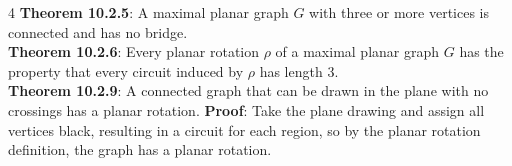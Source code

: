 \documentclass[letterpaper, 8pt]{extarticle}
\begin{document}
\begin{multicols*}{4}
	\textbf{Theorem 10.2.5}: A maximal planar graph $G$ with three or more vertices is connected and has no bridge. \\
	\textbf{Theorem 10.2.6}: Every planar rotation $\rho$ of a maximal planar graph $G$ has the property that every circuit induced by $\rho$ has length 3. \\
	\textbf{Theorem 10.2.9}: A connected graph that can be drawn in the plane with no crossings has a planar rotation. \textbf{Proof}: Take the plane drawing and assign all vertices black, resulting in a circuit for each region, so by the planar rotation definition, the graph has a planar rotation. \\


\end{multicols*}
\end{document}
